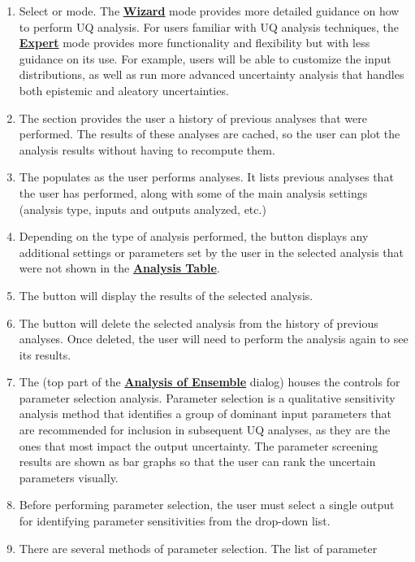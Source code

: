 \begin{enumerate}
\item
	Select  or  mode. The \textbf{\underline{Wizard}} mode provides more
   detailed guidance on how to perform UQ analysis. For users familiar with
   UQ analysis techniques, the \textbf{\underline{Expert}} mode provides more functionality
   and flexibility but with less guidance on its use. For example,
   users will be able to customize the input distributions, as well as run
   more advanced uncertainty analysis that handles both epistemic and
   aleatory uncertainties.
\item
	The  section provides the user a history of
	previous analyses that were performed. The results of these analyses are
	cached, so the user can plot the analysis results without having to
	recompute them. 
\item
	The  populates as the user performs analyses. It
	lists previous analyses that the user has performed, along with some 
	of the main analysis settings (analysis type, inputs and outputs analyzed,
	etc.)
\item
	Depending on the type of analysis performed, the  button displays
	any additional settings or parameters set by the user in the selected
	analysis that were not shown in the \textbf{\underline{Analysis Table}}.
\item
	The  button will display the results of the selected
	analysis. 
\item
	The  button will delete the selected analysis from the
   history of previous analyses.  Once deleted,
	the user will need to perform the analysis again to see its results.
\item
	The  (top part of the \textbf{\underline{Analysis of Ensemble}} dialog)
	houses the controls for parameter selection analysis. Parameter
	selection is a qualitative sensitivity analysis method that identifies a
	group of dominant input parameters that are recommended for inclusion in
	subsequent UQ analyses, as they are the ones that most impact the output
	uncertainty. The parameter screening results are shown as bar graphs so
   that the user can rank the uncertain parameters visually.
\item
	Before performing parameter selection, the user must select a single
	output for identifying parameter sensitivities from the  drop-down list.
\item
	There are several methods of parameter selection. The list of parameter

\end{enumerate}

